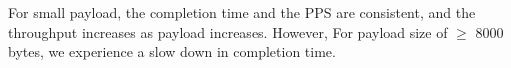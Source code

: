 \documentclass[12pt]{article}
\newenvironment{problem}[2][Problem]{\begin{trivlist}
\item[\hskip \labelsep {\bfseries #1}\hskip \labelsep {\bfseries #2.}]}{\end{trivlist}}
\begin{document}
\begin{problem}{2}
\begin{center}
\end{center}
For small payload, the completion time and the PPS are consistent, and the throughput increases as payload increases. However, For payload size of $\geq$ 8000 bytes, we experience a slow down in completion time.
\end{problem}
\begin{problem}{3}
\end{problem}
\end{document}
